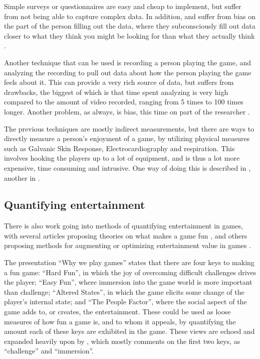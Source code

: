 Simple surveys or questionnaires are easy and cheap to implement, but suffer from
not being able to capture complex data. In addition, and suffer from bias on the
part of the person filling out the data, where they subconsciously fill out data
closer to what they think you might be looking for than what they actually think
\citep{mandryk2006using}.

Another technique that can be used is recording a person playing the game, and
analyzing the recording to pull out data about how the person playing the game
feels about it. This can provide a very rich source of data, but suffers from
drawbacks, the biggest of which is that time spent analyzing is very high
compared to the amount of video recorded, ranging from 5 times to 100 times
longer. Another problem, as always, is bias, this time on part of the
researcher \citep{mandryk2006using}.

The previous techniques are mostly indirect measurements, but there are ways to
directly measure a person's enjoyment of a game, by utilizing physical measures
such as Galvanic Skin Response, Electrocardiography and respiration. This
involves hooking the players up to a lot of equipment, and is thus a lot more
expensive, time consuming and intrusive. One way of doing this is described in
\citet{mandryk2006using}, another in \citet{yannakakis2008entertainment}.

\subsection{Quantifying entertainment}
\label{sec:quant-entert}

There is also work going into methods of quantifying entertainment in games,
with several articles proposing theories on what makes a game fun
\citep[e.g.][]{malone1981makes,read2002endurability,
  federoff2002heuristics,lazzaro2004we,koster2004theory}, and others proposing
methods for augmenting or optimizing entertainment value in games
\citep[e.g.][]{yannakakis2009real,yannakakis2008model,yannakakis2007towards,yannakakis2004interactive}.

The presentation ``Why we play games'' \citep{lazzaro2004we} states that there
are four keys to making a fun game: ``Hard Fun'', in which the joy of overcoming
difficult challenges drives the player; ``Easy Fun'', where immersion into the
game world is more important than challenge; ``Altered States'', in which the
game elicits some change of the player's internal state; and ``The People
Factor'', where the social aspect of the game adds to, or creates, the
entertainment. These could be used as loose measures of how fun a game is, and
to whom it appeals, by quantifying the amount each of these keys are exhibited
in the game. These views are echoed and expanded heavily upon by
\citet{federoff2002heuristics}, which mostly comments on the first two keys, as
``challenge'' and ``immersion''.

